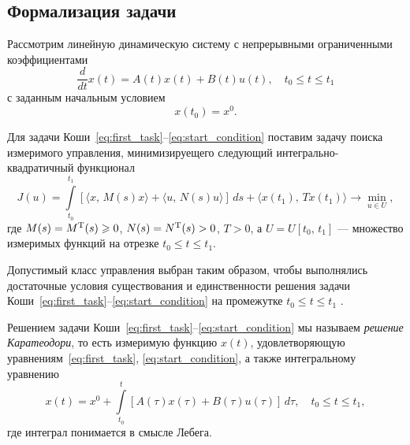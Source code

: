 \subsection{Формализация задачи}

Рассмотрим линейную динамическую систему с непрерывными ограниченными коэффициентами
\begin{equation}\label{eq:first_task}
        \frac{d}{dt}x(t) = A(t)x(t) + B(t)u(t),
        \quad
        t_0 \leqslant t \leqslant t_1
\end{equation}
с заданным начальным условием
\begin{equation}\label{eq:start_condition}
        x(t_0) = x^0.
\end{equation}

Для задачи Коши~\eqref{eq:first_task}--\eqref{eq:start_condition} поставим задачу поиска измеримого управления, минимизируещего следующий интегрально-квадратичный функционал
\begin{equation}\label{eq:functional}
        J(u)
=
        \int\limits_{t_0}^{t_1}
[
\langle
x,\,M(s)x
\rangle
+
\langle
u,\,N(s)u
\rangle
]\,ds
        +
        \langle
        x(t_1),\,Tx(t_1)
        \rangle
\to
        \min\limits_{u \in U},
\end{equation}
где $M(s) = M^\mathrm{T}(s) \geqslant 0$,
$N(s) = N^\mathrm{T}(s) > 0$,
$T > 0$,
а $U = U[t_0,\,t_1]$ --- мно\-жес\-т\-во измеримых функций на отрезке $t_0 \leqslant t \leqslant t_1$.

Допустимый класс управления выбран таким образом, чтобы выполнялись достаточные условия существования и единственности решения задачи Коши~\eqref{eq:first_task}--\eqref{eq:start_condition} на промежутке $t_0 \leqslant t \leqslant t_1$ \cite{filippov}.

\begin{remark}
        Решением задачи Коши~\eqref{eq:first_task}--\eqref{eq:start_condition} мы называем \textit{решение Каратеодори}, то есть измеримую функцию $x(t)$, удовлетворяющую уравнениям~\eqref{eq:first_task}, \eqref{eq:start_condition}, а также интегральному уравнению
$$
        x(t) = x^0 + \int\limits_{t_0}^{t} [A(\tau)x(\tau) + B(\tau)u(\tau)]\,d\tau,
        \quad
        t_0\leqslant t \leqslant t_1,
$$ 
        где интеграл понимается в смысле Лебега.
\end{remark}